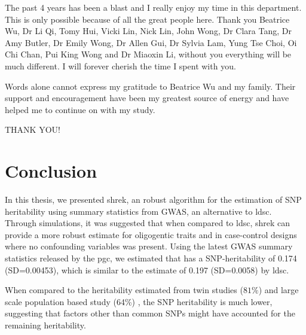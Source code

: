 \documentclass[12pt]{scrbook}
\newcommand*{\glng}{\glsentrylong}
\begin{document}
	The past 4 years has been a blast and I really enjoy my time in this department.
	This is only possible because of all the great people here.
	Thank you Beatrice Wu, Dr Li Qi, Tomy Hui, Vicki Lin, Nick Lin, John Wong, Dr Clara Tang, Dr Amy Butler, Dr Emily Wong, Dr Allen Gui, Dr Sylvia Lam, Yung Tse Choi, Oi Chi Chan, Pui King Wong and Dr Miaoxin Li, without you everything will be much different.
	I will forever cherish the time I spent with you. 
	
	Words alone cannot express my gratitude to Beatrice Wu and my family.
	Their support and encouragement have been my greatest source of energy and have helped me to continue on with my study. 
	
	\begin{center}
	\large THANK YOU!
	\end{center}
	\cleardoublepage
	\begin{singlespace}
	\printglossary[title=Abbreviations,toctitle=Abbreviations,style=long,nonumberlist]
	\cleardoublepage
	
	\cleardoublepage
		\tableofcontents
		\listoffigures
		\listoftables
	\end{singlespace}
\mainmatter
\pagestyle{fancy}

\setlength{\parindent}{4em}
\setlength{\parskip}{0.75em}
	
	
	
	
	\chapter{Conclusion}
	\label{conclusionChapter}
	\glsresetall
	In this thesis, we presented \gls{shrek}, an robust algorithm for the estimation of \gls{SNP} heritability using summary statistics from \gls{GWAS}, an alternative to \gls{ldsc}.
	Through simulations, it was suggested that when compared to \gls{ldsc}, \gls{shrek} can provide a more robust estimate for oligogentic traits and in case-control designs where no confounding variables was present. 
	Using the latest \gls{GWAS} summary statistics released by the \gls{pgc}, we estimated that \glng{scz} has a \gls{SNP}-heritability of 0.174 (SD=0.00453), which is similar to the estimate of 0.197 (SD=0.0058) by \gls{ldsc}.
	
	When compared to the heritability estimated from twin studies ($81\%$) \citep{Sullivan2003} and large scale population based study (64\%) \citep{Lichtenstein2009}, the \gls{SNP} heritability is much lower, suggesting that factors other than common \glspl{SNP} might have accounted for the remaining heritability.
	
\end{document}
